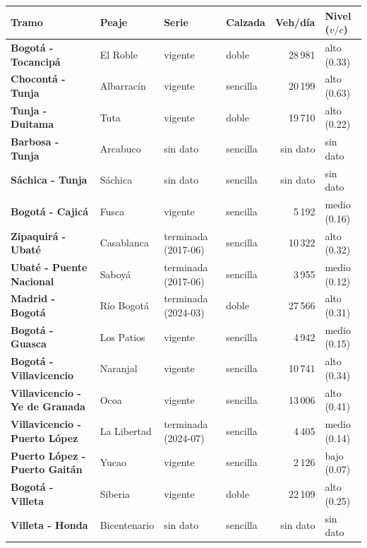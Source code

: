 \renewcommand{\arraystretch}{1.2}
\begin{tabular}{|>{\raggedright\arraybackslash}p{3.5cm}|>{\raggedright\arraybackslash}p{2.0cm}|>{\raggedright\arraybackslash}p{2.5cm}|l|r|>{\raggedright\arraybackslash}p{2.1cm}|}
\hline
\rowcolor{gray!20} \textbf{Tramo} & \textbf{Peaje} & \textbf{Serie} & \textbf{Calzada} & \textbf{Veh/día} & \textbf{Nivel ($v/c$)} \\
\hline
\textbf{Bogotá - Tocancipá} & El Roble & vigente & doble & 28\,981 & alto (0.33) \\
\hline
\textbf{Chocontá - Tunja} & Albarracín & vigente & sencilla & 20\,199 & alto (0.63) \\
\hline
\textbf{Tunja - Duitama} & Tuta & vigente & doble & 19\,710 & alto (0.22) \\
\hline
\textbf{Barbosa - Tunja} & Arcabuco & sin dato & sencilla & sin dato & sin dato \\
\hline
\textbf{Sáchica - Tunja} & Sáchica & sin dato & sencilla & sin dato & sin dato \\
\hline
\textbf{Bogotá - Cajicá} & Fusca & vigente & sencilla & 5\,192 & medio (0.16) \\
\hline
\textbf{Zipaquirá - Ubaté} & Casablanca & terminada (2017-06) & sencilla & 10\,322 & alto (0.32) \\
\hline
\textbf{Ubaté - Puente Nacional} & Saboyá & terminada (2017-06) & sencilla & 3\,955 & medio (0.12) \\
\hline
\textbf{Madrid - Bogotá} & Río Bogotá & terminada (2024-03) & doble & 27\,566 & alto (0.31) \\
\hline
\textbf{Bogotá - Guasca} & Los Patios & vigente & sencilla & 4\,942 & medio (0.15) \\
\hline
\textbf{Bogotá - Villavicencio} & Naranjal & vigente & sencilla & 10\,741 & alto (0.34) \\
\hline
\textbf{Villavicencio - Ye de Granada} & Ocoa & vigente & sencilla & 13\,006 & alto (0.41) \\
\hline
\textbf{Villavicencio - Puerto López} & La Libertad & terminada (2024-07) & sencilla & 4\,405 & medio (0.14) \\
\hline
\textbf{Puerto López - Puerto Gaitán} & Yucao & vigente & sencilla & 2\,126 & bajo (0.07) \\
\hline
\textbf{Bogotá - Villeta} & Siberia & vigente & doble & 22\,109 & alto (0.25) \\
\hline
\textbf{Villeta - Honda} & Bicentenario & sin dato & sencilla & sin dato & sin dato \\

\end{tabular}
